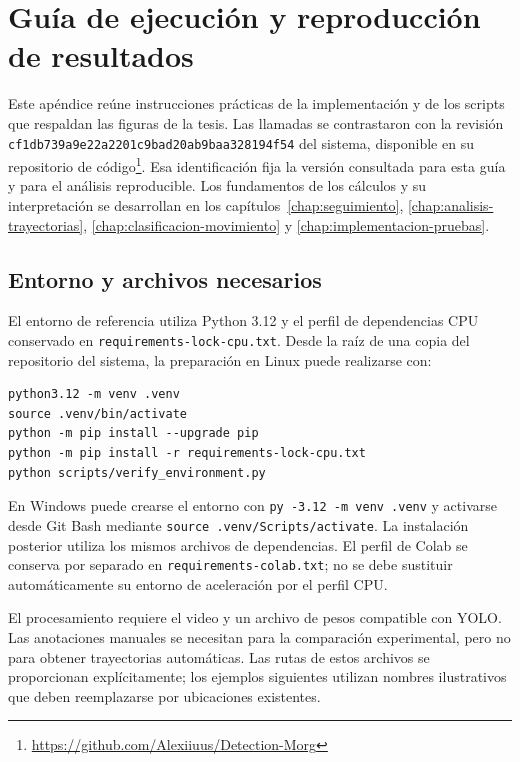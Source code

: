 \chapter{Guía de ejecución y reproducción de resultados}
\label{ap:guia-ejecucion}

Este apéndice reúne instrucciones prácticas de la implementación y de los scripts que respaldan las figuras de la tesis. Las llamadas se contrastaron con la revisión \nolinkurl{cf1db739a9e22a2201c9bad20ab9baa328194f54} del sistema, disponible en su repositorio de código\footnote{\url{https://github.com/Alexiiuus/Detection-Morg}}. Esa identificación fija la versión consultada para esta guía y para el análisis reproducible. Los fundamentos de los cálculos y su interpretación se desarrollan en los capítulos~\ref{chap:seguimiento}, \ref{chap:analisis-trayectorias}, \ref{chap:clasificacion-movimiento} y \ref{chap:implementacion-pruebas}.

\section{Entorno y archivos necesarios}

El entorno de referencia utiliza Python 3.12 y el perfil de dependencias CPU conservado en \nolinkurl{requirements-lock-cpu.txt}. Desde la raíz de una copia del repositorio del sistema, la preparación en Linux puede realizarse con:

\noindent\begin{minipage}{\linewidth}
\begin{lstlisting}[style=thesiscode]
python3.12 -m venv .venv
source .venv/bin/activate
python -m pip install --upgrade pip
python -m pip install -r requirements-lock-cpu.txt
python scripts/verify_environment.py
\end{lstlisting}
\end{minipage}\par

En Windows puede crearse el entorno con \verb|py -3.12 -m venv .venv| y activarse desde Git Bash mediante \verb|source .venv/Scripts/activate|. La instalación posterior utiliza los mismos archivos de dependencias. El perfil de Colab se conserva por separado en \nolinkurl{requirements-colab.txt}; no se debe sustituir automáticamente su entorno de aceleración por el perfil CPU.

El procesamiento requiere el video y un archivo de pesos compatible con YOLO. Las anotaciones manuales se necesitan para la comparación experimental, pero no para obtener trayectorias automáticas. Las rutas de estos archivos se proporcionan explícitamente; los ejemplos siguientes utilizan nombres ilustrativos que deben reemplazarse por ubicaciones existentes.

